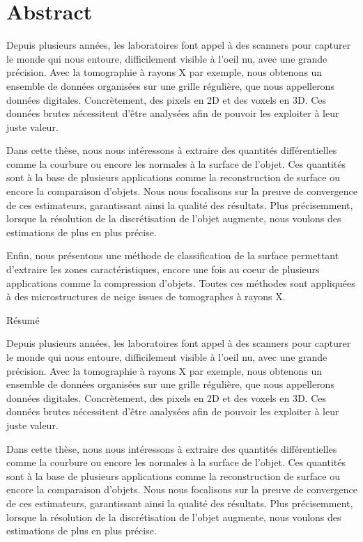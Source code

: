 %
\chapter*{Abstract}
\label{sec:abstract}
\vspace*{-10mm}

Depuis plusieurs années, les laboratoires font appel à des scanners pour
capturer le monde qui nous entoure, difficilement visible à l’oeil nu, avec une
grande précision. Avec la tomographie à rayons X par exemple, nous obtenons un
ensemble de données organisées sur une grille régulière, que nous appellerons
données digitales. Concrètement, des pixels en 2D et des voxels en 3D. Ces
données brutes nécessitent d’être analysées afin de pouvoir les exploiter à leur
juste valeur.

Dans cette thèse, nous nous intéressons à extraire des quantités différentielles
comme la courbure ou encore les normales à la surface de l’objet. Ces quantités
sont à la base de plusieurs applications comme la reconstruction de surface ou
encore la comparaison d’objets. Nous nous focalisons sur la preuve de
convergence de ces estimateurs, garantissant ainsi la qualité des résultats.
Plus précisemment, lorsque la résolution de la discrétisation de l’objet
augmente, nous voulons des estimations de plus en plus précise.

Enfin, nous présentons une méthode de classification de la surface permettant
d’extraire les zones caractéristiques, encore une fois au coeur de plusieurs
applications comme la compression d’objets. Toutes ces méthodes sont appliquées à
des microstructures de neige issues de tomographes à rayons X.

\vspace*{20mm}

{Résumé}
\label{sec:abstract-french}
\vspace*{5mm}

Depuis plusieurs années, les laboratoires font appel à des scanners pour
capturer le monde qui nous entoure, difficilement visible à l’oeil nu, avec une
grande précision. Avec la tomographie à rayons X par exemple, nous obtenons un
ensemble de données organisées sur une grille régulière, que nous appellerons
données digitales. Concrètement, des pixels en 2D et des voxels en 3D. Ces
données brutes nécessitent d’être analysées afin de pouvoir les exploiter à leur
juste valeur.

Dans cette thèse, nous nous intéressons à extraire des quantités différentielles
comme la courbure ou encore les normales à la surface de l’objet. Ces quantités
sont à la base de plusieurs applications comme la reconstruction de surface ou
encore la comparaison d’objets. Nous nous focalisons sur la preuve de
convergence de ces estimateurs, garantissant ainsi la qualité des résultats.
Plus précisemment, lorsque la résolution de la discrétisation de l’objet
augmente, nous voulons des estimations de plus en plus précise.

